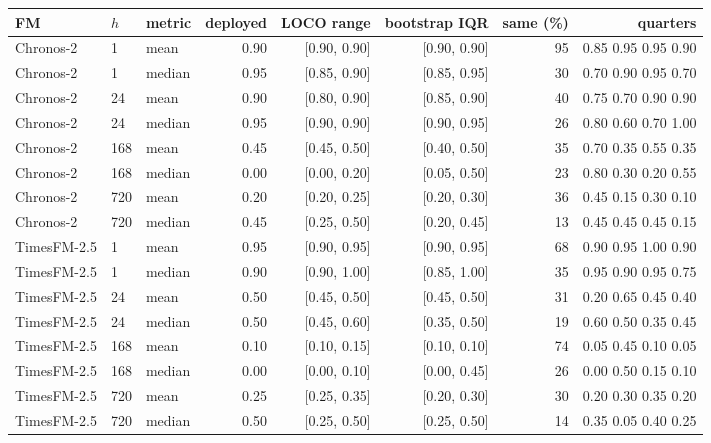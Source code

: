 \begin{tabular}{lllrrrrr}
\toprule
FM & $h$ & metric & deployed & LOCO range & bootstrap IQR & same (\%) & quarters \\
\midrule
Chronos-2 & 1 & mean & 0.90 & [0.90, 0.90] & [0.90, 0.90] & 95 & 0.85 0.95 0.95 0.90 \\
Chronos-2 & 1 & median & 0.95 & [0.85, 0.90] & [0.85, 0.95] & 30 & 0.70 0.90 0.95 0.70 \\
Chronos-2 & 24 & mean & 0.90 & [0.80, 0.90] & [0.85, 0.90] & 40 & 0.75 0.70 0.90 0.90 \\
Chronos-2 & 24 & median & 0.95 & [0.90, 0.90] & [0.90, 0.95] & 26 & 0.80 0.60 0.70 1.00 \\
Chronos-2 & 168 & mean & 0.45 & [0.45, 0.50] & [0.40, 0.50] & 35 & 0.70 0.35 0.55 0.35 \\
Chronos-2 & 168 & median & 0.00 & [0.00, 0.20] & [0.05, 0.50] & 23 & 0.80 0.30 0.20 0.55 \\
Chronos-2 & 720 & mean & 0.20 & [0.20, 0.25] & [0.20, 0.30] & 36 & 0.45 0.15 0.30 0.10 \\
Chronos-2 & 720 & median & 0.45 & [0.25, 0.50] & [0.20, 0.45] & 13 & 0.45 0.45 0.45 0.15 \\
TimesFM-2.5 & 1 & mean & 0.95 & [0.90, 0.95] & [0.90, 0.95] & 68 & 0.90 0.95 1.00 0.90 \\
TimesFM-2.5 & 1 & median & 0.90 & [0.90, 1.00] & [0.85, 1.00] & 35 & 0.95 0.90 0.95 0.75 \\
TimesFM-2.5 & 24 & mean & 0.50 & [0.45, 0.50] & [0.45, 0.50] & 31 & 0.20 0.65 0.45 0.40 \\
TimesFM-2.5 & 24 & median & 0.50 & [0.45, 0.60] & [0.35, 0.50] & 19 & 0.60 0.50 0.35 0.45 \\
TimesFM-2.5 & 168 & mean & 0.10 & [0.10, 0.15] & [0.10, 0.10] & 74 & 0.05 0.45 0.10 0.05 \\
TimesFM-2.5 & 168 & median & 0.00 & [0.00, 0.10] & [0.00, 0.45] & 26 & 0.00 0.50 0.15 0.10 \\
TimesFM-2.5 & 720 & mean & 0.25 & [0.25, 0.35] & [0.20, 0.30] & 30 & 0.20 0.30 0.35 0.20 \\
TimesFM-2.5 & 720 & median & 0.50 & [0.25, 0.50] & [0.25, 0.50] & 14 & 0.35 0.05 0.40 0.25 \\
\bottomrule
\end{tabular}
